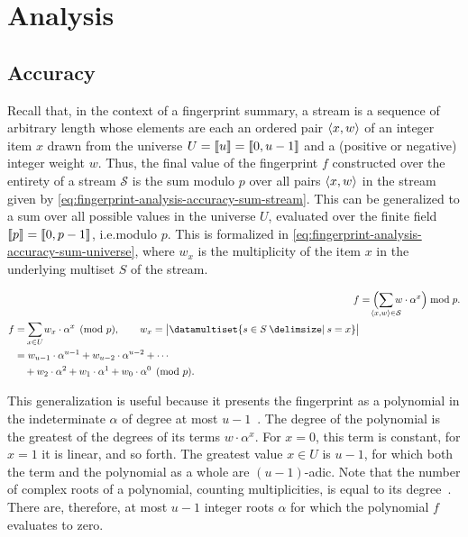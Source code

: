 \section{Analysis}
\label{sec:fingerprint-analysis}

\subsection{Accuracy}
\label{subsec:fingerprint-analysis-accuracy}

Recall that, in the context of a fingerprint summary, a stream is a sequence of arbitrary length whose elements are each an ordered pair \( \langle x, w\rangle \) of an integer item \( x \) drawn from the universe \( U = \llbracket u\rrbracket = \llbracket0, u - 1\rrbracket \) and a (positive or negative) integer weight \( w \).
Thus, the final value of the fingerprint \( f \) constructed over the entirety of a stream \( \mathcal{S} \) is the sum modulo \( p \) over all pairs \( \langle x, w\rangle \) in the stream given by \cref{eq:fingerprint-analysis-accuracy-sum-stream}.
This can be generalized to a sum over all possible values in the universe \( U \), evaluated over the finite field \( \llbracket p\rrbracket = \llbracket0, p - 1\rrbracket \), i.e.\@ modulo \( p \).
This is formalized in \cref{eq:fingerprint-analysis-accuracy-sum-universe}, where \( w_{x} \) is the multiplicity of the item \( x \) in the underlying multiset \( S \) of the stream.

\begin{align}
  \label{eq:fingerprint-analysis-accuracy-sum-stream}
  f &= \Bigl( \smashoperator{\sum_{\datasequence{x, w} \in \mathcal{S}}} w \cdot \alpha^{x} \Bigr) \bmod p. \\
  \label{eq:fingerprint-analysis-accuracy-sum-universe}
  \begin{split}
    f &= \smashoperator{\sum_{x \in U}} w_{x} \cdot \alpha^{x} \pmod p, \qquad w_{x} = \cardinality[\big]{\datamultiset{s \in S \suchthat s = x}} \\
    &= w_{u - 1} \cdot \alpha^{u - 1} + w_{u - 2} \cdot \alpha^{u - 2} + \dotsb \\
    &\quad + w_{2} \cdot \alpha^{2} + w_{1} \cdot \alpha^{1} + w_{0} \cdot \alpha^{0} \pmod p.
  \end{split}
\end{align}

This generalization is useful because it presents the fingerprint as a polynomial in the indeterminate \( \alpha \) of degree at most \( u - 1 \)~\citep{cormode20}.
The degree of the polynomial is the greatest of the degrees of its terms \( w \cdot \alpha^{x} \).
For \( x = 0 \), this term is constant, for \( x = 1 \) it is linear, and so forth.
The greatest value \( x \in U \) is \( u - 1 \), for which both the term and the polynomial as a whole are \( (u - 1) \)-adic.
Note that the number of complex roots of a polynomial, counting multiplicities, is equal to its degree~\citep{graham94}.
There are, therefore, at most \( u - 1 \) integer roots \( \alpha \) for which the polynomial \( f \) evaluates to zero.

